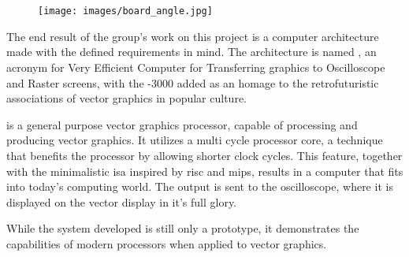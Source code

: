 \chapter{\vthreek}

\begin{figure}[H]
    \centering \texttt{[image: images/board\_angle.jpg]}
    \caption{\vthreek}
    \label{fig:board-angle}
\end{figure}

The end result of the group's work on this project is a computer architecture made with the defined requirements in mind.
The architecture is named \vthreek, an acronym for Very Efficient Computer for Transferring graphics to Oscilloscope and Raster screens, with the -3000 added as an homage to the retrofuturistic associations of vector graphics in popular culture.

\vthreek is a general purpose vector graphics processor, capable of processing and producing vector graphics. 
It utilizes a multi cycle processor core, a technique that benefits the processor by allowing shorter clock cycles.
This feature, together with the minimalistic \gls{isa} inspired by \gls{risc}\cite{risc} and \gls{mips}\cite{mips}, results in a computer that fits into today's computing world.
The output is sent to the oscilloscope, where it is displayed on the vector display in it's full glory.

While the system developed is still only a prototype, it demonstrates the capabilities of modern processors when applied to vector graphics. 



